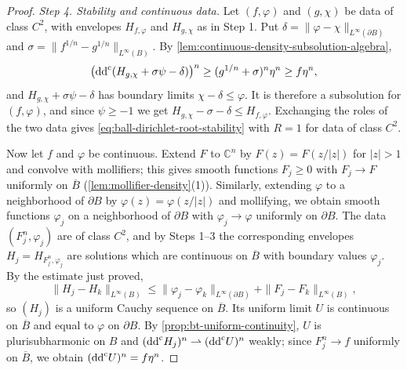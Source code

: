 \begin{proof}
\emph{Step 4. Stability and continuous data.}
Let $(f,\varphi)$ and $(g,\chi)$ be data of class $C^2$, with envelopes $H_{f,\varphi}$ and $H_{g,\chi}$ as in Step 1. Put $\delta=\|\varphi-\chi\|_{L^\infty(\partial B)}$ and $\sigma=\|f^{1/n}-g^{1/n}\|_{L^\infty(B)}$. By \cref{lem:continuous-density-subsolution-algebra},
\[
 \bigl(\mathrm{dd}^{\mathrm{c}}(H_{g,\chi}+\sigma\psi-\delta)\bigr)^n\ge(g^{1/n}+\sigma)^n\eta^n\ge f\eta^n,
\]
and $H_{g,\chi}+\sigma\psi-\delta$ has boundary limits $\chi-\delta\le\varphi$. It is therefore a subsolution for $(f,\varphi)$, and since $\psi\ge-1$ we get $H_{g,\chi}-\sigma-\delta\le H_{f,\varphi}$. Exchanging the roles of the two data gives \eqref{eq:ball-dirichlet-root-stability} with $R=1$ for data of class $C^2$.

Now let $f$ and $\varphi$ be continuous. Extend $F$ to $\mathbb C^n$ by $F(z)=F(z/|z|)$ for $|z|>1$ and convolve with mollifiers; this gives smooth functions $F_j\ge0$ with $F_j\to F$ uniformly on $\overline B$ (\cref{lem:mollifier-density}(1)). Similarly, extending $\varphi$ to a neighborhood of $\partial B$ by $\varphi(z)=\varphi(z/|z|)$ and mollifying, we obtain smooth functions $\varphi_j$ on a neighborhood of $\partial B$ with $\varphi_j\to\varphi$ uniformly on $\partial B$. The data $(F_j^n,\varphi_j)$ are of class $C^2$, and by Steps 1--3 the corresponding envelopes $H_j=H_{F_j^n,\varphi_j}$ are solutions which are continuous on $\overline B$ with boundary values $\varphi_j$. By the estimate just proved,
\[
 \|H_j-H_k\|_{L^\infty(B)}\le\|\varphi_j-\varphi_k\|_{L^\infty(\partial B)}+\|F_j-F_k\|_{L^\infty(B)},
\]
so $(H_j)$ is a uniform Cauchy sequence on $\overline B$. Its uniform limit $U$ is continuous on $\overline B$ and equal to $\varphi$ on $\partial B$. By \cref{prop:bt-uniform-continuity}, $U$ is plurisubharmonic on $B$ and $(\mathrm{dd}^{\mathrm{c}} H_j)^n\rightharpoonup(\mathrm{dd}^{\mathrm{c}} U)^n$ weakly; since $F_j^n\to f$ uniformly on $\overline B$, we obtain $(\mathrm{dd}^{\mathrm{c}} U)^n=f\eta^n$.


\end{proof}
